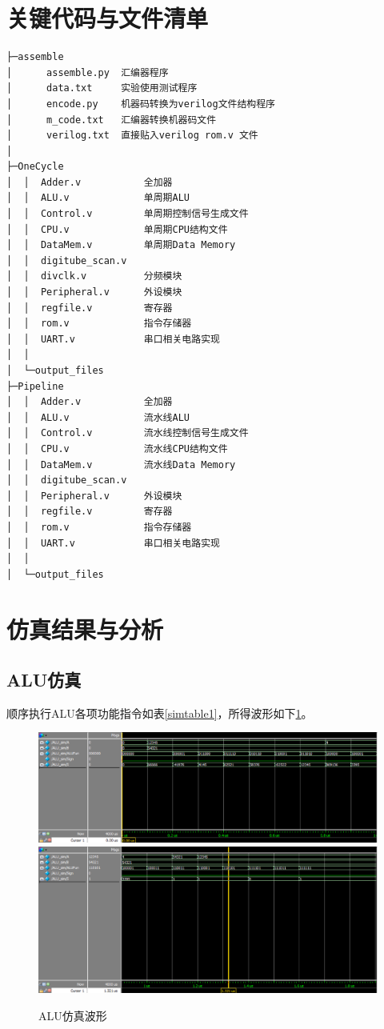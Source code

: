\documentclass{ctexart}
\begin{document}
	\section{关键代码与文件清单}
\begin{verbatim}
├─assemble
│      assemble.py  汇编器程序
│      data.txt		实验使用测试程序
│      encode.py	机器码转换为verilog文件结构程序
│      m_code.txt	汇编器转换机器码文件
│      verilog.txt	直接贴入verilog rom.v 文件
│
├─OneCycle
│  │  Adder.v			全加器
│  │  ALU.v				单周期ALU
│  │  Control.v			单周期控制信号生成文件
│  │  CPU.v				单周期CPU结构文件
│  │  DataMem.v			单周期Data Memory
│  │  digitube_scan.v	
│  │  divclk.v			分频模块
│  │  Peripheral.v		外设模块
│  │  regfile.v			寄存器
│  │  rom.v				指令存储器
│  │  UART.v			串口相关电路实现
│  │
│  └─output_files
├─Pipeline
│  │  Adder.v			全加器
│  │  ALU.v				流水线ALU
│  │  Control.v			流水线控制信号生成文件
│  │  CPU.v				流水线CPU结构文件
│  │  DataMem.v			流水线Data Memory
│  │  digitube_scan.v	
│  │  Peripheral.v		外设模块
│  │  regfile.v			寄存器
│  │  rom.v				指令存储器
│  │  UART.v			串口相关电路实现
│  │
│  └─output_files
\end{verbatim}
	\section{仿真结果与分析}
	\subsection{ALU仿真}
	顺序执行ALU各项功能指令如表\ref{simtable1}，所得波形如下\ref{simpicture1}。
	\begin{figure}[ht][ht]
		\centering
		\includegraphics[width = \textwidth]{ALUsim-1.eps}
		\includegraphics[width = \textwidth]{ALUsim-2.eps}
		\caption{ALU仿真波形}
		\label{simpicture1}
	\end{figure}
\end{document}
